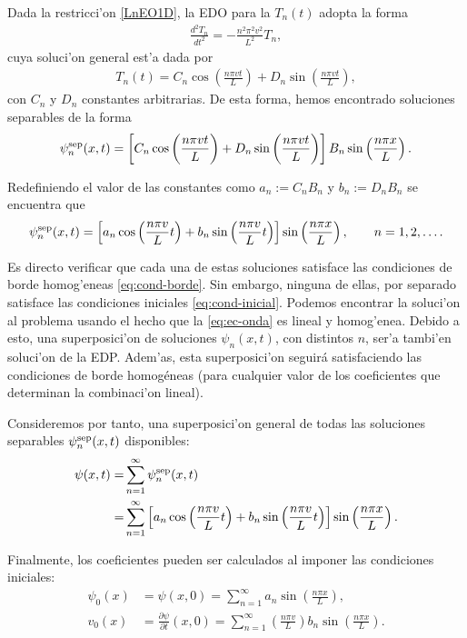 Dada la restricci'on \eqref{LnEO1D}, la EDO para la $T_{n}(t)$ adopta la forma
\begin{align}
\frac{d^2 T_{n}}{dt^2}=-\frac{n^2 \pi^2v^2}{L^2}T_{n},
\end{align}
cuya soluci'on general est'a dada por
\begin{align}
T_{n}(t)=C_{n}\cos\left(\frac{n \pi vt}{L}\right)+D_{n}\sin\left(\frac{n\pi vt}{L}\right),
\end{align}
con $C_{n}$ y $D_{n}$ constantes arbitrarias. De esta forma, hemos encontrado soluciones separables de la forma
\begin{align}
\psi^{\rm sep}_n(x,t)=\left[C_{n}\cos\left(\frac{n \pi vt}{L}\right)+D_{n}\sin\left(\frac{n\pi vt}{L}\right) \right]B_{n}\sin\left(\frac{n \pi x}{L}\right).
\end{align}

Redefiniendo el valor de las constantes como $a_{n}:=C_{n}B_{n}$ y $b_{n}:=D_{n}B_{n}$ se encuentra que
\begin{align}
\psi^{\rm sep}_{n}(x,t)=\left[a_{n}\cos\left(\frac{n \pi v}{L}t\right)+b_{n}\sin\left(\frac{n \pi v}{L}t\right)\right] \sin\left(\frac{n\pi x}{L}\right), \qquad n=1,2,\dots.
\end{align}

Es directo verificar que cada una de estas soluciones satisface las condiciones de borde homog'eneas \eqref{eq:cond-borde}. Sin embargo, ninguna de ellas, por separado satisface las condiciones iniciales \eqref{eq:cond-inicial}. Podemos encontrar la soluci'on al problema usando el hecho que la \eqref{eq:ec-onda} es lineal y homog'enea. Debido a esto, una superposici'on de soluciones $\psi_{n}(x,t)$, con distintos $n$, ser'a tambi'en soluci'on de la EDP. Adem'as, esta superposici'on seguirá satisfaciendo las condiciones de borde homogéneas (para cualquier valor de los coeficientes que determinan la combinaci'on lineal).

Consideremos por tanto, una superposici'on general de todas las soluciones separables $\psi^{\rm sep}_{n}(x,t)$ disponibles:
\begin{align}
\psi(x,t)=&\sum_{n=1}^{\infty}\psi^{\rm sep}_{n}(x,t)\\
=&\sum_{n=1}^{\infty}\left[a_{n}\cos\left(\frac{n \pi v}{L}t\right)+b_{n}\sin\left(\frac{n \pi v}{L}t\right)\right] \sin\left(\frac{n\pi x}{L}\right).
\end{align}

Finalmente, los coeficientes pueden ser calculados al imponer las condiciones iniciales:
\begin{align}
\psi_{0}(x) &= \psi(x,0)=\sum_{n=1}^{\infty}a_{n}\sin\left(\frac{n \pi x}{L}\right),\label{eq:psi0}\\
v_{0}(x) &= \frac{\partial \psi}{\partial t}(x,0)=\sum_{n=1}^{\infty}\left( \frac{n \pi v}{L}\right) b_{n}\sin\left( \frac{n \pi x}{L}\right).\label{eq:v0}
\end{align}

